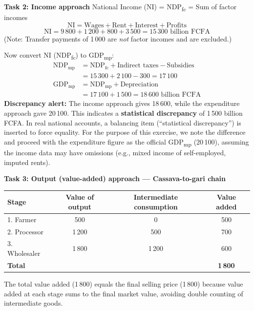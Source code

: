 \documentclass[11pt]{article}
\begin{document}
\textbf{Task 2: Income approach}
National Income (NI) = NDP\textsubscript{fc} = Sum of factor incomes
\[
\text{NI} = \text{Wages} + \text{Rent} + \text{Interest} + \text{Profits}
\]
\[
\text{NI} = 9\,800 + 1\,200 + 800 + 3\,500 = \boxed{15\,300 \text{ billion FCFA}}
\]
(Note: Transfer payments of 1\,000 are \emph{not} factor incomes and are excluded.)

Now convert NI (NDP\textsubscript{fc}) to GDP\textsubscript{mp}:
\begin{align*}
\text{NDP}_{\text{mp}} &= \text{NDP}_{\text{fc}} + \text{Indirect taxes} - \text{Subsidies} \\
&= 15\,300 + 2\,100 - 300 = 17\,100 \\[4pt]
\text{GDP}_{\text{mp}} &= \text{NDP}_{\text{mp}} + \text{Depreciation} \\
&= 17\,100 + 1\,500 = \boxed{18\,600 \text{ billion FCFA}}
\end{align*}
\textbf{Discrepancy alert:} The income approach gives 18\,600, while the expenditure approach gave 20\,100. This indicates a \textbf{statistical discrepancy} of 1\,500 billion FCFA. In real national accounts, a balancing item (``statistical discrepancy'') is inserted to force equality. For the purpose of this exercise, we note the difference and proceed with the expenditure figure as the official GDP\textsubscript{mp} (20\,100), assuming the income data may have omissions (e.g., mixed income of self-employed, imputed rents).

\textbf{Task 3: Output (value-added) approach --- Cassava-to-gari chain}
\begin{center}
\begin{tabular}{|l|c|c|c|}
\hline
\rowcolor{popblueL}
\textbf{Stage} & \textbf{Value of output} & \textbf{Intermediate consumption} & \textbf{Value added} \\
\hline
1. Farmer & 500 & 0 & 500 \\
2. Processor & 1\,200 & 500 & 700 \\
3. Wholesaler & 1\,800 & 1\,200 & 600 \\
\hline
\textbf{Total} & & & \textbf{1\,800} \\
\hline
\end{tabular}
\end{center}
The total value added (1\,800) equals the final selling price (1\,800) because value added at each stage sums to the final market value, avoiding double counting of intermediate goods.
\end{document}
